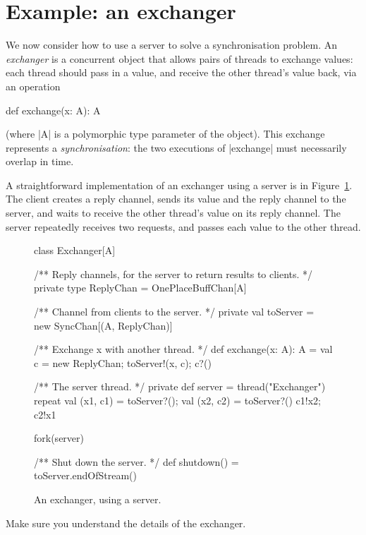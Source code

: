 \section{Example: an exchanger}

We now consider how to use a server to solve a synchronisation problem.  An
\emph{exchanger} is a concurrent object that allows pairs of threads to
exchange values: each thread should pass in a value, and receive the other
thread's value back, via an operation
\begin{scala}
  def exchange(x: A): A 
\end{scala}
(where |A| is a polymorphic type parameter of the object).  This exchange
represents a \emph{synchronisation}: the two executions of |exchange| must
necessarily overlap in time.

A straightforward implementation of an exchanger using a server is in
Figure~\ref{fig:exchanger}.  The client creates a reply channel, sends its
value and the reply channel to the server, and waits to receive the other
thread's value on its reply channel.  The server repeatedly receives two
requests, and passes each value to the other thread.


\begin{figure}
\begin{scala}
class Exchanger[A]{
  /** Reply channels, for the server to return results to clients. */
  private type ReplyChan = OnePlaceBuffChan[A]

  /** Channel from clients to the server. */
  private val toServer = new SyncChan[(A, ReplyChan)]

  /** Exchange x with another thread. */
  def exchange(x: A): A = {
    val c = new ReplyChan; toServer!(x, c); c?()
  }

  /** The server thread. */
  private def server = thread("Exchanger"){
    repeat{
      val (x1, c1) = toServer?(); val (x2, c2) = toServer?()
      c1!x2; c2!x1
    }
  }

  fork(server)

  /** Shut down the server. */
  def shutdown() = toServer.endOfStream()
}
\end{scala}
\caption{An exchanger, using a server.}
\label{fig:exchanger}
\end{figure}


\begin{instruction}
Make sure you understand the details of the exchanger.
\end{instruction}

